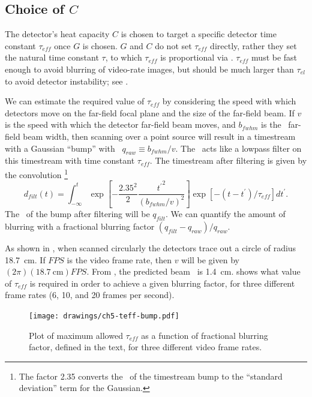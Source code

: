 \subsection{Choice of $C$}

The detector's heat capacity $C$ is chosen to target a specific detector time constant $\tau_{eff}$ once $G$ is chosen.
$G$ and $C$ do not set $\tau_{eff}$ directly, rather they set the natural time constant $\tau$, to which $\tau_{eff}$ is proportional via .
$\tau_{eff}$ must be fast enough to avoid blurring of video-rate images, but should be much larger than $\tau_{el}$ to avoid detector instability; see .

We can estimate the required value of $\tau_{eff}$ by considering the speed with which detectors move on the far-field focal plane and the size of the far-field beam.
If $v$ is the speed with which the detector far-field beam moves, and $b_{fwhm}$ is the \FWHM\ far-field beam width, then scanning over a point source will result in a timestream with a Gaussian ``bump'' with \FWHM\ $q_{raw} \equiv b_{fwhm} / v$.
The \TES\ acts like a lowpass filter on this timestream with time constant $\tau_{eff}$.
The timestream after filtering is given by the convolution%
\footnote{The factor 2.35 converts the \FWHM\ of the timestream bump to the ``standard deviation'' term for the Gaussian.}
\begin{equation}
  d_{filt}(t) = \int_{-\infty}^{t} \exp{\left[-\frac{2.35^2}{2} \frac{{t^{\prime}}^2}{(b_{fwhm}/v)^2}\right]}
       \exp{\left[-(t-t^{\prime})/\tau_{eff}\right]} dt^{\prime}.
\end{equation}
The \FWHM\ of the bump after filtering will be $q_{filt}$.
We can quantify the amount of blurring with a fractional blurring factor $(q_{filt} - q_{raw})/q_{raw}$.

As shown in , when scanned circularly the detectors trace out a circle of radius \SI{18.7}{\cm}.
If $FPS$ is the video frame rate, then $v$ will be given by $(2 \pi)(\SI{18.7}{\cm}) FPS$.
From , the predicted beam \FWHM\ is \SI{1.4}{\cm}.
 shows what value of $\tau_{eff}$ is required in order to achieve a given blurring factor, for three different frame rates (6, 10, and 20 frames per second).

\begin{figure}
\centering
\texttt{[image: drawings/ch5-teff-bump.pdf]}
\caption[Maximum $\tau_{eff}$ for no blurring]{
  Plot of maximum allowed $\tau_{eff}$ as a function of fractional blurring factor, defined in the text, for three different video frame rates.
}
\label{fig:ch5-teff-bump}
\end{figure}

